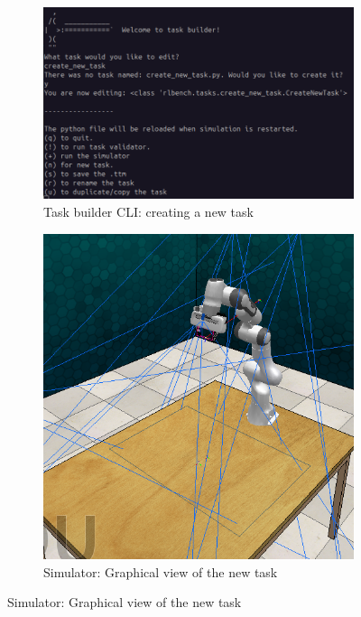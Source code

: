 \begin{figure}[htbp]
  \begin{subfigure}{0.48\linewidth}
    \centering
    \includegraphics[width=\linewidth]{assets/early-work/task-builder-cli-1.png}      \caption{Task builder CLI: creating a new task}
  \end{subfigure}%
  \hfill
  \begin{subfigure}{0.48\textwidth}
    \centering
    \includegraphics[width=\linewidth]{assets/early-work/task-builder-scene.png}
    \caption{Simulator: Graphical view of the new task}
  \end{subfigure}%
  

\end{figure}
